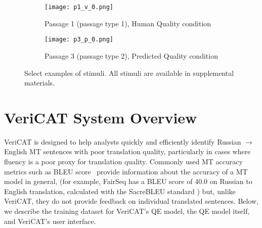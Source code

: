 
\begin{figure}
    \centering
    
    \begin{subfigure}[t]{0.45\textwidth}
        \centering
        \texttt{[image: p1\_v\_0.png]} 
        \caption{Passage 1 (passage type 1), Human Quality condition} \label{fig:p1_human_quality}
    \end{subfigure}
    \hfill
     \begin{subfigure}[t]{0.45\textwidth}
        \centering
        \texttt{[image: p3\_p\_0.png]} 
        \caption{Passage 3 (passage type 2), Predicted Quality condition} \label{fig:p3_predicted_quality}
    \end{subfigure}
    
    \caption{Select examples of stimuli. All stimuli are available in supplemental materials.}
    \label{fig:exp_stim}
    
\end{figure}

\section{VeriCAT System Overview}
VeriCAT is designed to help analysts quickly and efficiently identify Russian $\rightarrow$ English MT sentences with poor translation quality, particularly in cases where fluency is a poor proxy for translation quality. %
Commonly used MT accuracy metrics such as BLEU score~\cite{papineni-etal-2002-bleu} provide information about the accuracy of a MT model in general, (for example, FairSeq has a BLEU score of 40.0 on Russian to English translation, calculated with the SacreBLEU standard \cite{post-2018-call}) but, unlike VeriCAT, they do not provide feedback on individual translated sentences.  
Below, we describe the training dataset for VeriCAT's QE model, the QE model itself, and VeriCAT's user interface.    

